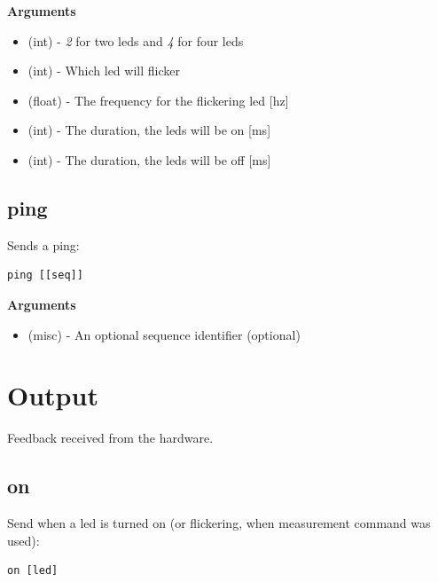 \textbf{Arguments}
\begin{itemize}
\item {} 
 (int) - \emph{2} for two leds and \emph{4} for four leds

\item {} 
 (int) - Which led will flicker

\item {} 
 (float) - The frequency for the flickering led {[}hz{]}

\item {} 
 (int) - The duration, the leds will be on {[}ms{]}

\item {} 
 (int) - The duration, the leds will be off {[}ms{]}

\end{itemize}


\subsection{ping}
\label{appendix/led-protocol:ping}\label{appendix/led-protocol:protocol-input-ping}
Sends a ping:

\begin{verbatim}
ping [[seq]]
\end{verbatim}

\textbf{Arguments}
\begin{itemize}
\item {} 
 (misc) - An optional sequence identifier (optional)

\end{itemize}


\section{Output}
\label{appendix/led-protocol:output}\label{appendix/led-protocol:protocol-output}
Feedback received from the hardware.


\subsection{on}
\label{appendix/led-protocol:protocol-output-on}\label{appendix/led-protocol:id1}
Send when a led is turned on (or flickering, when measurement command was used):

\begin{verbatim}
on [led]
\end{verbatim}

